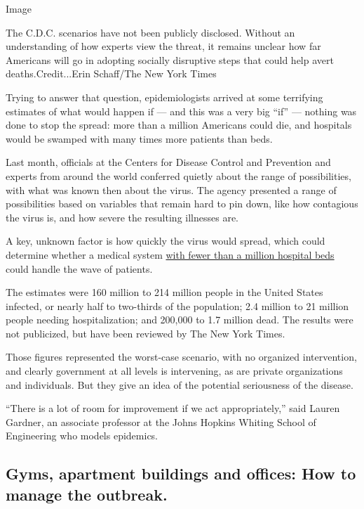 Image

The C.D.C. scenarios have not been publicly disclosed. Without an
understanding of how experts view the threat, it remains unclear how far
Americans will go in adopting socially disruptive steps that could help
avert deaths.Credit...Erin Schaff/The New York Times

Trying to answer that question, epidemiologists arrived at some
terrifying estimates of what would happen if --- and this was a very big
``if'' --- nothing was done to stop the spread: more than a million
Americans could die, and hospitals would be swamped with many times more
patients than beds.

Last month, officials at the Centers for Disease Control and Prevention
and experts from around the world conferred quietly about the range of
possibilities, with what was known then about the virus. The agency
presented a range of possibilities based on variables that remain hard
to pin down, like how contagious the virus is, and how severe the
resulting illnesses are.

A key, unknown factor is how quickly the virus would spread, which could
determine whether a medical system
\href{https://www.aha.org/statistics/fast-facts-us-hospitals}{with fewer
than a million hospital beds} could handle the wave of patients.

The estimates were 160 million to 214 million people in the United
States infected, or nearly half to two-thirds of the population; 2.4
million to 21 million people needing hospitalization; and 200,000 to 1.7
million dead. The results were not publicized, but have been reviewed by
The New York Times.

Those figures represented the worst-case scenario, with no organized
intervention, and clearly government at all levels is intervening, as
are private organizations and individuals. But they give an idea of the
potential seriousness of the disease.

``There is a lot of room for improvement if we act appropriately,'' said
Lauren Gardner, an associate professor at the Johns Hopkins Whiting
School of Engineering who models epidemics.

\hypertarget{gyms-apartment-buildings-and-offices-how-to-manage-the-outbreak}{%
\subsection{Gyms, apartment buildings and offices: How to manage the
outbreak.}\label{gyms-apartment-buildings-and-offices-how-to-manage-the-outbreak}}

